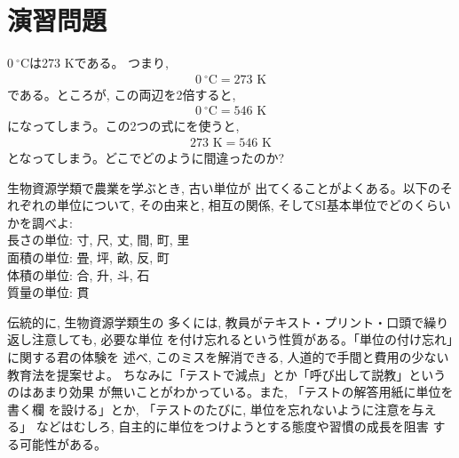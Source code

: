 
\mv


\section*{演習問題}

\begin{exq}\label{q:degC_K} $0\ {}^\circ\mathrm{C}$は273 Kである。
つまり, 
\begin{eqnarray}
0\ {}^\circ\mathrm{C}=273\text{ K}
\end{eqnarray}
である。ところが, この両辺を2倍すると, 
\begin{eqnarray}
0\ {}^\circ\mathrm{C}=546\text{ K}
\end{eqnarray}
になってしまう。この2つの式にを使うと, 
\begin{eqnarray}
273\text{ K}=546\text{ K}
\end{eqnarray}
となってしまう。どこでどのように間違ったのか?
\end{exq}

\begin{exq}\label{q:unit_old} 生物資源学類で農業を学ぶとき, 古い単位が
出てくることがよくある。以下のそれぞれの単位について, その由来と, 
相互の関係, そしてSI基本単位でどのくらいかを調べよ:\\
長さの単位: 寸, 尺, 丈, 間, 町, 里\\
面積の単位: 畳, 坪, 畝, 反, 町\\
体積の単位: 合, 升, 斗, 石\\
質量の単位: 貫
\end{exq}

\begin{exq}\label{q:unit_missing} 伝統的に, 生物資源学類生の
多くには, 教員がテキスト・プリント・口頭で繰り返し注意しても, 必要な単位
を付け忘れるという性質がある。「単位の付け忘れ」に関する君の体験を
述べ, このミスを解消できる, 人道的で手間と費用の少ない教育法を提案せよ。
ちなみに「テストで減点」とか「呼び出して説教」というのはあまり効果
が無いことがわかっている。また, 「テストの解答用紙に単位を書く欄
を設ける」とか, 「テストのたびに, 単位を忘れないように注意を与える」
などはむしろ, 自主的に単位をつけようとする態度や習慣の成長を阻害
する可能性がある。
\end{exq}

